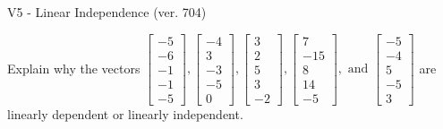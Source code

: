 \begin{exercise}
  \begin{exerciseTitle}V5 - Linear Independence (ver. 704)\end{exerciseTitle}
  \begin{exerciseStatement}
    Explain why the vectors \(\left[\begin{array}{r}
-5 \\
-6 \\
-1 \\
-1 \\
-5
\end{array}\right] , \left[\begin{array}{r}
-4 \\
3 \\
-3 \\
-5 \\
0
\end{array}\right] , \left[\begin{array}{r}
3 \\
2 \\
5 \\
3 \\
-2
\end{array}\right] , \left[\begin{array}{r}
7 \\
-15 \\
8 \\
14 \\
-5
\end{array}\right] , \text{ and } \left[\begin{array}{r}
-5 \\
-4 \\
5 \\
-5 \\
3
\end{array}\right]\) are linearly dependent or linearly independent.	



\end{exerciseStatement}
\end{exercise}
